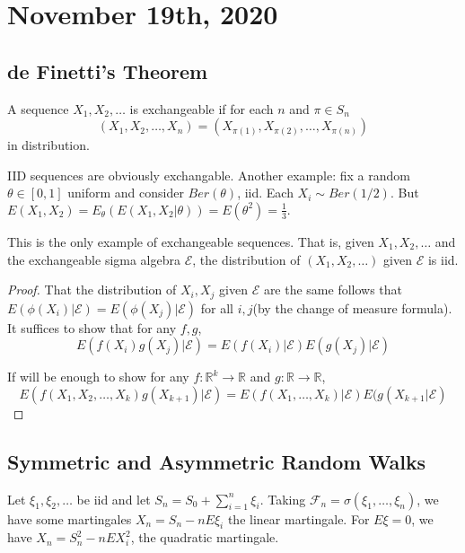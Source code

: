 \documentclass[11pt]{scrartcl}
\newcommand{\R}{\mathbb{R}}
\let \mc \mathcal
\begin{document}
\section{November 19th, 2020}
\subsection{de Finetti's Theorem}

\begin{definition}A sequence $X_1, X_2, \dots$  is exchangeable if for each $n$ and $\pi \in S_n$ $$(X_1, X_2, \dots, X_n) = (X_{\pi(1)}, X_{\pi(2)}, \dots, X_{\pi(n)})$$
in distribution.
\end{definition}

\begin{example} IID sequences are obviously exchangable.  Another example: fix a random $\theta \in [0, 1]$
 uniform and consider $Ber(\theta)$, iid. Each $X_i \sim Ber(1/2)$.  But $E(X_1, X_2) = E_\theta(E(X_1, X_2 | \theta)) = E(\theta^2) = \frac{1}{3}.$   
\end{example}

\begin{theorem} This is the only example of exchangeable sequences. That is, given $X_1, X_2, \dots$ and the exchangeable sigma algebra $\mc E$,  the distribution of $(X_1, X_2, \dots) $ given $\mc E$ is iid.
\end{theorem}
\begin{proof}
That the distribution of $X_i, X_j$ given $\mc E$ are the same follows that $E(\phi(X_i)| \mc E) = E(\phi(X_j)| \mc E)$ for all $i, j$(by the change of measure formula).  It suffices to show that for any $f, g$, 
$$E(f(X_i)g(X_j)| \mc E) = E(f(X_i)|\mc E) E(g(X_j)| \mc E)$$

If will be enough to show for any $f: \R^k \to \R$ and $g: \R \to \R$, 
$$E(f(X_1, X_2, \dots, X_k)g(X_{k+1})| \mc E) = E(f(X_1, \dots, X_k)|\mc E) E(g(X_{k+1}| \mc E)$$
\end{proof}

\subsection{Symmetric and Asymmetric Random Walks}
Let $\xi_1, \xi_2, \dots$ be iid and let $S_n = S_0 + \sum_{i=1}^n \xi_i$.  Taking $\mc F_n = \sigma(\xi_1, \dots, \xi_n)$, we have some martingales $X_n = S_n - n E\xi_i$ the linear martingale.  For $E\xi = 0$, we have $X_n = S_n^2 - nEX_i^2$, the quadratic martingale.
\end{document}
